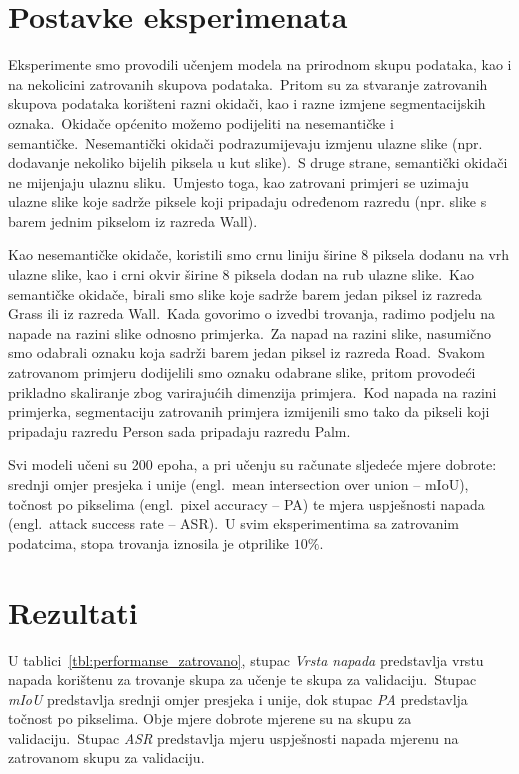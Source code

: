 \documentclass[times, utf8, seminar, numeric]{fer}
\begin{document}
\section{Postavke eksperimenata}

Eksperimente smo provodili učenjem modela na prirodnom skupu podataka, kao i na nekolicini zatrovanih skupova podataka.\ Pritom su za stvaranje zatrovanih skupova podataka korišteni razni okidači, kao i razne izmjene segmentacijskih oznaka.\ 
Okidače općenito možemo podijeliti na nesemantičke i semantičke.\ Nesemantički okidači podrazumijevaju izmjenu ulazne slike (npr. dodavanje nekoliko bijelih piksela u kut slike).\ S druge strane, semantički okidači ne mijenjaju ulaznu sliku.\ 
Umjesto toga, kao zatrovani primjeri se uzimaju ulazne slike koje sadrže piksele koji pripadaju određenom razredu (npr. slike s barem jednim pikselom iz razreda Wall).
  
Kao nesemantičke okidače, koristili smo crnu liniju širine 8 piksela dodanu na vrh ulazne slike, kao  i crni okvir širine 8 piksela dodan na rub ulazne slike.\ Kao semantičke okidače, birali smo slike koje sadrže barem jedan piksel iz razreda Grass ili iz razreda Wall.\ 
Kada govorimo o izvedbi trovanja, radimo podjelu na napade na razini slike odnosno primjerka.\ Za napad na razini slike, nasumično smo odabrali oznaku koja sadrži barem jedan piksel iz razreda Road.\ Svakom zatrovanom primjeru dodijelili smo oznaku odabrane slike, pritom provodeći prikladno skaliranje zbog varirajućih dimenzija primjera.\ 
Kod napada na razini primjerka, segmentaciju zatrovanih primjera izmijenili smo tako da pikseli koji pripadaju razredu Person sada pripadaju razredu Palm.
  
Svi modeli učeni su 200 epoha, a pri učenju su računate sljedeće mjere dobrote: srednji omjer presjeka i unije (engl.\ mean intersection over union – mIoU), točnost po pikselima (engl.\ pixel accuracy – PA) te mjera uspješnosti napada (engl.\ attack success rate – ASR).\ 
U svim eksperimentima sa zatrovanim podatcima, stopa trovanja iznosila je otprilike $10\%$. 

\section{Rezultati}

U tablici~\ref{tbl:performanse_zatrovano}, stupac \textit{Vrsta napada} predstavlja vrstu napada korištenu za trovanje skupa za učenje te skupa za validaciju.\ 
Stupac \textit{mIoU} predstavlja srednji omjer presjeka i unije, dok stupac \textit{PA} predstavlja točnost po pikselima. Obje mjere dobrote mjerene su na skupu za validaciju.\ 
Stupac \textit{ASR} predstavlja mjeru uspješnosti napada mjerenu na zatrovanom skupu za validaciju.
\end{document}

